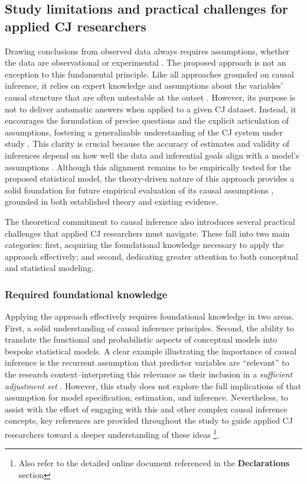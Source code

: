 \documentclass[
  authoryear,
  review,
  1p]{elsarticle}
\begin{document}
\subsection{Study limitations and practical challenges for applied CJ
researchers}\label{sec-discussion_challenges}

Drawing conclusions from observed data always requires assumptions,
whether the data are observational or experimental
\citep{Kohler_et_al_2019, Deffner_et_al_2022}. The proposed approach is
not an exception to this fundamental principle. Like all approaches
grounded on causal inference, it relies on expert knowledge and
assumptions about the variables' causal structure that are often
untestable at the outset \citep{Hernan_et_al_2025}. However, its purpose
is not to deliver automatic answers when applied to a given CJ dataset.
Instead, it encourages the formulation of precise questions and the
explicit articulation of assumptions, fostering a generalizable
understanding of the CJ system under study
\citep{Rohrer_et_al_2022, Deffner_et_al_2022, Sterner_et_al_2024}. This
clarity is crucial because the accuracy of estimates and validity of
inferences depend on how well the data and inferential goals align with
a model's assumptions \citep{Kohler_et_al_2019}. Although this alignment
remains to be empirically tested for the proposed statistical model, the
theory-driven nature of this approach provides a solid foundation for
future empirical evaluation of its causal assumptions
\citep{Deffner_et_al_2022}, grounded in both established theory and
existing evidence.

The theoretical commitment to causal inference also introduces several
practical challenges that applied CJ researchers must navigate. These
fall into two main categories: first, acquiring the foundational
knowledge necessary to apply the approach effectively; and second,
dedicating greater attention to both conceptual and statistical
modeling.

\subsubsection{Required foundational
knowledge}\label{sec-discussion_challenges1}

Applying the approach effectively requires foundational knowledge in two
areas. First, a solid understanding of causal inference principles.
Second, the ability to translate the functional and probabilistic
aspects of conceptual models into bespoke statistical models. A clear
example illustrating the importance of causal inference is the recurrent
assumption that predictor variables are ``relevant'' to the research
context--interpreting this relevance as their inclusion in a
\emph{sufficient adjustment set}
\citep{Pearl_2009, Pearl_et_al_2016, Morgan_et_al_2014}. However, this
study does not explore the full implications of that assumption for
model specification, estimation, and inference. Nevertheless, to assist
with the effort of engaging with this and other complex causal inference
concepts, key references are provided throughout the study to guide
applied CJ researchers toward a deeper understanding of these ideas
\footnote{Also refer to the detailed online document referenced in the
  \textbf{Declarations} section}.
\end{document}
